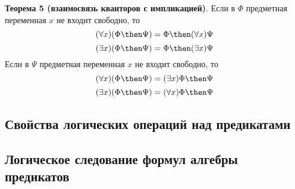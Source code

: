 \textbf{Теорема 5 (взаимосвязь кванторов с импликацией)}. Если в $\Phi$ предметная переменная $x$ не входит свободно, то
$$(\forall x)(\Phi \then \Psi) = \Phi \then (\forall x)\Psi$$
$$(\exists x)(\Phi \then \Psi) = \Phi \then (\exists x)\Psi$$
Если в $\Psi$ предметная переменная $x$ не входит свободно, то
$$(\forall x)(\Phi \then \Psi) = (\exists x)\Phi \then \Psi$$
$$(\exists x)(\Phi \then \Psi) = (\forall x)\Phi \then \Psi$$


\subsection{Свойства логических операций над предикатами}
\subsection{Логическое следование формул алгебры предикатов}
